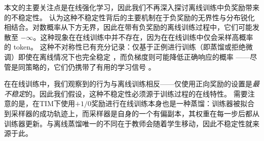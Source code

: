 本文的主要关注点是在线强化学习，因此我们不再深入探讨离线训练中负奖励带来的不稳定性。 认为这种不稳定性背后的主要机制在于负奖励的无界性与分布锐化相结合。对数概率从下方无界，因此在带有负奖励的离线训练过程中，它们可能发散至 $-\infty$。这种现象在在线训练中并不存在，因为在在线训练中仅会采样高概率的 token。  
这种不对称性已有充分记录：仅基于正例进行训练（即蒸馏或拒绝微调）即使在离线情况下也完全稳定 \citep{distillation, deepseek_r1}，而负梯度则可能降低正确响应的概率 \citep{nthr}——尽管是同策略的，它们仍携带了有用的学习信号 \citep{negative_reinforcement}。

在在线训练中，我们观察到的行为与离线训练相反——仅使用正向奖励的设置是\emph{最不稳定}的。因此我们假设，这种不稳定性必须源于训练过程的在线特性。
需要注意的是，在TIM下使用$+1/0$奖励进行在线训练本身也是一种蒸馏：训练器被拟合到采样器的成功轨迹上，而采样器是自身的一个有偏副本，其权重在每一步后都从训练器更新。与离线蒸馏唯一的不同在于教师会随着学生移动，因此不稳定性就来源于此。